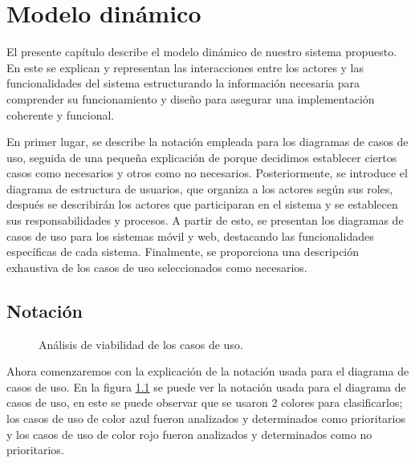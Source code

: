 \chapter{Modelo dinámico}	
\label{cap:modDinamico}

El presente capítulo describe el modelo dinámico de nuestro sistema propuesto. En este se explican y representan las interacciones entre los actores y las funcionalidades del sistema estructurando la información necesaria para comprender su funcionamiento y diseño para asegurar una implementación coherente y funcional.

En primer lugar, se describe la notación empleada para los diagramas de casos de uso, seguida de una pequeña explicación de porque decidimos establecer ciertos casos como necesarios y otros como no necesarios. Posteriormente, se introduce el diagrama de estructura de usuarios, que organiza a los actores según sus roles, después se describirán los actores que participaran en el sistema y se establecen sus responsabilidades y procesos. A partir de esto, se presentan los diagramas de casos de uso para los sistemas móvil y web, destacando las funcionalidades específicas de cada sistema. Finalmente, se proporciona una descripción exhaustiva de los casos de uso seleccionados como necesarios.

\section{Notación}


\begin{figure}[htbp!]
	\begin{center}
		\caption{Análisis de viabilidad de los casos de uso.}
		\label{fig:Notacion}
	\end{center}
\end{figure}

Ahora comenzaremos con la explicación de la notación usada para el diagrama de casos de uso. En la figura \ref{fig:Notacion} se puede ver la notación usada para el diagrama de casos de uso, en este se puede observar que se usaron 2 colores para clasificarlos; los casos de uso de color azul fueron analizados y determinados como prioritarios y los casos de uso de color rojo fueron analizados y determinados como no prioritarios.

